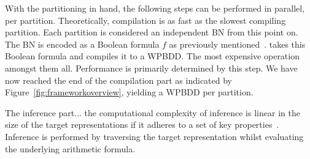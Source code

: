 With the partitioning in hand, the following steps can be performed in parallel, per partition. Theoretically, compilation is as fast as the slowest compiling partition. Each partition is considered an independent BN from this point on. The BN is encoded as a Boolean formula $f$ as previously mentioned~\cite{chavira2008probabilistic}. \toolname takes this Boolean formula and compiles it to a WPBDD. The most expensive operation amongst them all. Performance is primarily determined by this step. We have now reached the end of the compilation part as indicated by Figure~\ref{fig:frameworkoverview}, yielding a WPBDD per partition.

The inference part...
the computational complexity of inference is linear in the size of the target representations if it adheres to a set of key properties~\cite{darwiche2002knowledge}. Inference is performed by traversing the target representation whilst evaluating the underlying arithmetic formula.

